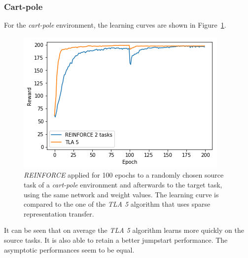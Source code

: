 \subsubsection{Cart-pole} %
\label{ssub:reinforce_source_target:cart_pole}
For the \textit{cart-pole} environment, the learning curves are shown in Figure~\ref{fig:carpole:reward_reinforce_2tasks}.
\begin{figure}[htb]
    \centering
    \includegraphics[width=.8\linewidth]{images/results/CartPole/reinforce_2tasks.png}
    \caption{\textit{REINFORCE} applied for 100 epochs to a randomly chosen source task of a \textit{cart-pole} environment and afterwards to the target task, using the same network and weight values. The learning curve is compared to the one of the \textit{TLA 5} algorithm that uses sparse representation transfer.}
    \label{fig:carpole:reward_reinforce_2tasks}
\end{figure}
It can be seen that on average the \textit{TLA 5} algorithm learns more quickly on the source tasks. It is also able to retain a better jumpstart performance. The asymptotic performances seem to be equal.

